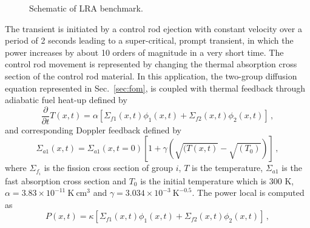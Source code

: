 \documentclass[review,number,sort&compress,12pt]{elsarticle}
\begin{document}
\begin{figure}[h!]
	\caption{Schematic of LRA benchmark.}
	\label{fig:lra core}
\end{figure}
The transient is initiated by a control rod ejection with constant velocity over a period of 2 seconds leading to a super-critical, prompt transient, in which the power increases by about 10 orders of magnitude in a very short time.
The control rod movement is represented by changing the thermal absorption cross section of the control rod material.
In this application, the two-group diffusion equation represented in Sec.~\ref{sec:fom}, is coupled with thermal feedback through adiabatic fuel heat-up defined by
\begin{equation}
\frac{\partial}{\partial t}T(x,t) = \alpha[\Sigma_{f1}(x,t)\phi_1(x,t)+\Sigma_{f2}(x,t)\phi_2(x,t)] \, ,
\label{eq:heatup}
\end{equation}
and corresponding Doppler feedback defined by
\begin{equation}
\Sigma_{a1}(x,t) = \Sigma_{a1}(x,t=0)[1+\gamma(\sqrt{(T(x,t)}-\sqrt{(T_0)})] \, ,
\label{eq:doppler}
\end{equation}
where $\Sigma_{f_i}$ is the fission cross section of group $i$, $T$ is the temperature, $\Sigma_{a1}$ is the fast absorption cross section and $T_0$ is the initial temperature which is $300 $ K,
$\alpha = 3.83\times 10^{-11}~\text{K}~\text{cm}^3$ and $\gamma = 3.034\times 10^{-3} ~\text{K}^{-0.5}$.
The power local is computed as
\begin{equation}
P(x,t)=\kappa [\Sigma_{f1}(x,t)\phi_1(x,t)+\Sigma_{f2}(x,t)\phi_2(x,t)] \, ,
\end{equation}
\end{document}
